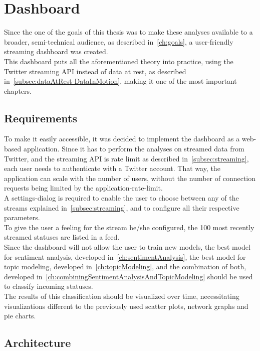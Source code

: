 \chapter{Dashboard}
\label{ch:dashboard}

Since the one of the goals of this thesis was to make these analyses available to a broader,
semi-technical audience, as described in~\ref{ch:goals},
a user-friendly streaming dashboard was created.
\\
This dashboard puts all the aforementioned theory into practice,
using the Twitter streaming API instead of data at rest,
as described in~\ref{subsec:dataAtRest-DataInMotion},
making it one of the most important chapters.

\section{Requirements}
\label{sec:requirement}

To make it easily accessible, it was decided to implement the dashboard as a web-based application.
Since it has to perform the analyses on streamed data from Twitter,
and the streaming API is rate limit as described in~\ref{subsec:streaming},
each user needs to authenticate with a Twitter account.
That way, the application can scale with the number of users,
without the number of connection requests being limited by the application-rate-limit.
\\
A settings-dialog is required to enable the user to choose between any of the streams explained in~\ref{subsec:streaming},
and to configure all their respective parameters.
\\
To give the user a feeling for the stream he/she configured,
the 100 most recently streamed statuses are listed in a feed.
\\
Since the dashboard will not allow the user to train new models,
the best model for sentiment analysis, developed in~\ref{ch:sentimentAnalysis},
the best model for topic modeling, developed in~\ref{ch:topicModeling},
and the combination of both, developed in~\ref{ch:combiningSentimentAnalysisAndTopicModeling}
should be used to classify incoming statuses.
\\
The results of this classification should be visualized over time,
necessitating visualizations different to the previously used scatter plots, network graphs and pie charts.

\section{Architecture}
\label{sec:architecture}

